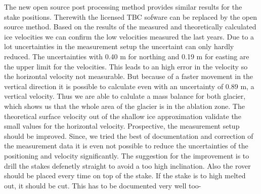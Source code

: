 The new open source post processing method provides similar results for the stake positions.
Therewith the licensed TBC sofware can be replaced by the open source method.
Based on the results of the measured and theoretically calculated ice velocities we can confirm the low velocities measured the last years.
Due to a lot uncertainties in the measurement setup the uncertaint can only hardly reduced.
The uncertainties with 0.40 m for northing and 0.19 m for easting are the upper limit for the velocities. 
This leads to an high error in the velocity so the horizontal velocity not measurable.
But because of a faster movement in the vertical direction it is possible to calculate even with an uncertainty of 0.89 m, a vertical velocity.
Thus we are able to calulate a mass balance for both glacier, which shows us that the whole area of the glacier is in the ablation zone.
The theoretical surface velocity out of the shallow ice approximation validate the small values for the horizontal velocity.
Prospective, the measurement setup should be improved. 
Since, we tried the best of documentation and correction of the measurement data it is even not possible to reduce the uncertainties of the positioning and velocity significantly. 
The suggestion for the improvement is to drill the stakes defenetly straight to avoid a too high inclination.
Also the rover should be placed every time on top of the stake.
If the stake is to high melted out, it should be cut. 
This has to be documented very well too- 
